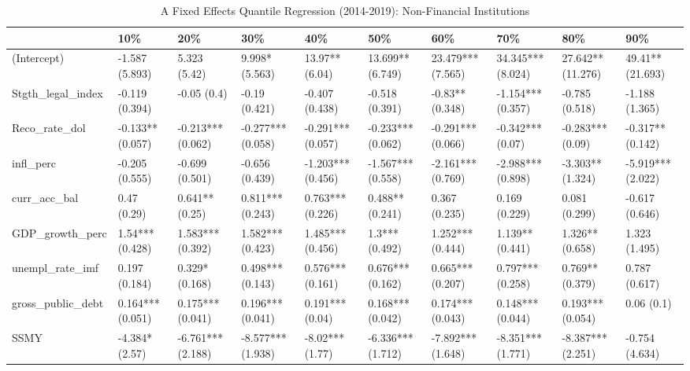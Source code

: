 \begin{table}[ht]
\centering
\caption{A Fixed Effects Quantile Regression (2014-2019): Non-Financial Institutions} 
\begingroup\small
\begin{tabular}{llllllllll}
  \toprule
 & 10\% & 20\% & 30\% & 40\% & 50\% & 60\% & 70\% & 80\% & 90\% \\ 
  \midrule
(Intercept) & -1.587 (5.893) & 5.323 (5.42) & 9.998* (5.563) & 13.97** (6.04) & 13.699** (6.749) & 23.479*** (7.565) & 34.345*** (8.024) & 27.642** (11.276) & 49.41** (21.693) \\ 
  Stgth\_legal\_index & -0.119 (0.394) & -0.05 (0.4) & -0.19 (0.421) & -0.407 (0.438) & -0.518 (0.391) & -0.83** (0.348) & -1.154*** (0.357) & -0.785 (0.518) & -1.188 (1.365) \\ 
  Reco\_rate\_dol & -0.133** (0.057) & -0.213*** (0.062) & -0.277*** (0.058) & -0.291*** (0.057) & -0.233*** (0.062) & -0.291*** (0.066) & -0.342*** (0.07) & -0.283*** (0.09) & -0.317** (0.142) \\ 
  infl\_perc & -0.205 (0.555) & -0.699 (0.501) & -0.656 (0.439) & -1.203*** (0.456) & -1.567*** (0.558) & -2.161*** (0.769) & -2.988*** (0.898) & -3.303** (1.324) & -5.919*** (2.022) \\ 
  curr\_acc\_bal & 0.47 (0.29) & 0.641** (0.25) & 0.811*** (0.243) & 0.763*** (0.226) & 0.488** (0.241) & 0.367 (0.235) & 0.169 (0.229) & 0.081 (0.299) & -0.617 (0.646) \\ 
  GDP\_growth\_perc & 1.54*** (0.428) & 1.583*** (0.392) & 1.582*** (0.423) & 1.485*** (0.456) & 1.3*** (0.492) & 1.252*** (0.444) & 1.139** (0.441) & 1.326** (0.658) & 1.323 (1.495) \\ 
  unempl\_rate\_imf & 0.197 (0.184) & 0.329* (0.168) & 0.498*** (0.143) & 0.576*** (0.161) & 0.676*** (0.162) & 0.665*** (0.207) & 0.797*** (0.258) & 0.769** (0.379) & 0.787 (0.617) \\ 
  gross\_public\_debt & 0.164*** (0.051) & 0.175*** (0.041) & 0.196*** (0.041) & 0.191*** (0.04) & 0.168*** (0.042) & 0.174*** (0.043) & 0.148*** (0.044) & 0.193*** (0.054) & 0.06 (0.1) \\ 
  SSMY & -4.384* (2.57) & -6.761*** (2.188) & -8.577*** (1.938) & -8.02*** (1.77) & -6.336*** (1.712) & -7.892*** (1.648) & -8.351*** (1.771) & -8.387*** (2.251) & -0.754 (4.634) \\ 
   \bottomrule
\end{tabular}
\endgroup
\end{table}
